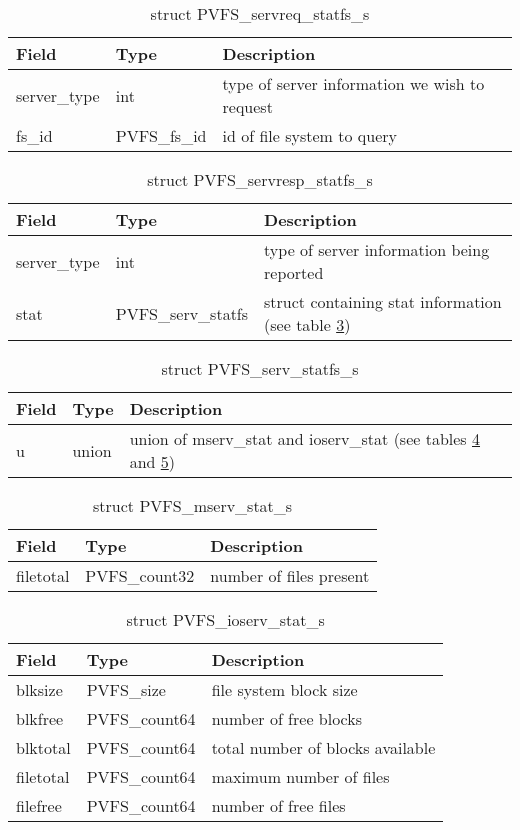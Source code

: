 \documentclass[11pt, letterpaper]{article} %
\begin{document}
\begin{table}[H]
\begin{tabular}{|l|l|l|}
\hline
Field & Type & Description \\
\hline
\hline
server\_type & int & type of server information we wish to request\\
\hline
fs\_id & PVFS\_fs\_id & id of file system to query\\
\hline
\end{tabular}
\caption{struct PVFS\_servreq\_statfs\_s \label{tab:reqstatfs}}
\end{table}

\begin{table}[H]
\begin{tabular}{|l|l|l|}
\hline
Field & Type & Description \\
\hline
\hline
server\_type & int & type of server information being reported\\
\hline
stat & PVFS\_serv\_statfs & struct containing stat information (see
table \ref{tab:servstatfs})\\
\hline
\end{tabular}
\caption{struct PVFS\_servresp\_statfs\_s \label{tab:respstatfs}}
\end{table}

\begin{table}[H]
\begin{tabular}{|l|l|l|}
\hline
Field & Type & Description \\
\hline
\hline
u & union & union of mserv\_stat and ioserv\_stat (see tables
\ref{tab:mservstat} and \ref{tab:ioservstat})\\
\hline
\end{tabular}
\caption{struct PVFS\_serv\_statfs\_s \label{tab:servstatfs}}
\end{table}


\begin{table}[H]
\begin{tabular}{|l|l|l|}
\hline
Field & Type & Description \\
\hline
filetotal & PVFS\_count32 & number of files present\\
\hline
\end{tabular}
\caption{struct PVFS\_mserv\_stat\_s \label{tab:mservstat}}
\end{table}


\begin{table}[H]
\begin{tabular}{|l|l|l|}
\hline
Field & Type & Description \\
\hline
\hline
blksize & PVFS\_size & file system block size\\
\hline
blkfree & PVFS\_count64 & number of free blocks\\
\hline
blktotal & PVFS\_count64 & total number of blocks available\\
\hline
filetotal & PVFS\_count64 & maximum number of files\\
\hline
filefree & PVFS\_count64 & number of free files\\
\hline
\end{tabular}
\caption{struct PVFS\_ioserv\_stat\_s \label{tab:ioservstat}}
\end{table}
\end{document}
